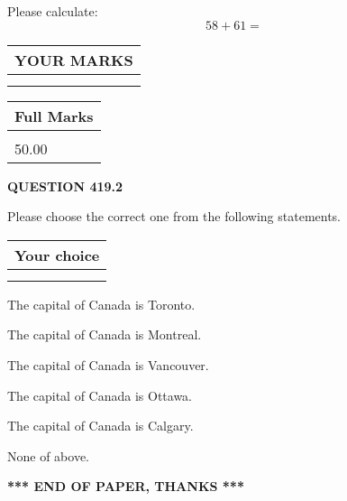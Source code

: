 \documentclass[12pt]{article}
\begin{document}
  
 
Please calculate:
\begin{equation}
58 +  %
61 = \nonumber
\end{equation}
 

 

 
  
\vspace{0.2in}
  
\noindent\begin{tabular}{|l|}
\hline
 YOUR MARKS  \\
\hline
 \\ 
 \\ 
\hline
\end{tabular}
\hspace{0.05in} \begin{tabular}{|l|}
\hline
 Full Marks  \\
\hline
 \\ 
50.00 \\
\hline
\end{tabular}
{\textbf{\Large{QUESTION
419.2 
}}}
  
  
Please choose the correct one from the following statements.
  
  
\noindent\hspace{3.0in} \begin{tabular}{|l|}
\hline
Your choice \\
\hline
 \\ 
 \\ 
\hline
\end{tabular}
  
  
 
 
The capital of Canada is Toronto.
 
 
The capital of Canada is Montreal.
 
 
The capital of Canada is Vancouver.
 
 
The capital of Canada is Ottawa.
 
 
The capital of Canada is Calgary.
 
 
 None of above.
 
 
   
   
 \vspace{0.2in}
 
   
   
   
   
\vspace{1.0in} 
{\textbf{\large{ *** END OF PAPER, THANKS *** }}} 
   
\end{document}
